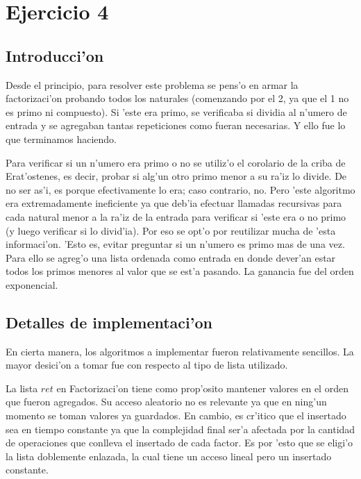\newpage
\section{Ejercicio 4}

\subsection{Introducci'on}
Desde el principio, para resolver este problema se pens'o en armar la factorizaci'on probando todos los naturales (comenzando por el 2, ya que el 1 no es primo ni compuesto). Si 'este era primo, se verificaba si dividia al n'umero de entrada y se agregaban tantas repeticiones como fueran necesarias. Y ello fue lo que terminamos haciendo.

Para verificar si un n'umero era primo o no se utiliz'o el corolario de la criba de Erat'ostenes, es decir, probar si alg'un otro primo menor a su ra'iz lo divide. De no ser as'i, es porque efectivamente lo era; caso contrario, no. Pero 'este algoritmo era extremadamente ineficiente ya que deb'ia efectuar llamadas recursivas para cada natural menor a la ra'iz de la entrada para verificar si 'este era o no primo (y luego verificar si lo divid'ia). Por eso se opt'o por reutilizar mucha de 'esta informaci'on. 'Esto es, evitar preguntar si un n'umero es primo mas de una vez. Para ello se agreg'o una lista ordenada como entrada en donde dever'an estar todos los primos menores al valor que se est'a pasando. La ganancia fue del orden exponencial.


\subsection{Detalles de implementaci'on}
En cierta manera, los algoritmos a implementar fueron relativamente sencillos. La mayor desici'on a tomar fue con respecto al tipo de lista utilizado. 

La lista $ret$ en Factorizaci'on tiene como prop'osito mantener valores en el orden que fueron agregados. Su acceso aleatorio no es relevante ya que en ning'un momento se toman valores ya guardados. En cambio, es cr'itico que el insertado sea en tiempo constante ya que la complejidad final ser'a afectada por la cantidad de operaciones que conlleva el insertado de cada factor. Es por 'esto que se eligi'o la lista doblemente enlazada, la cual tiene un acceso lineal pero un insertado constante.

